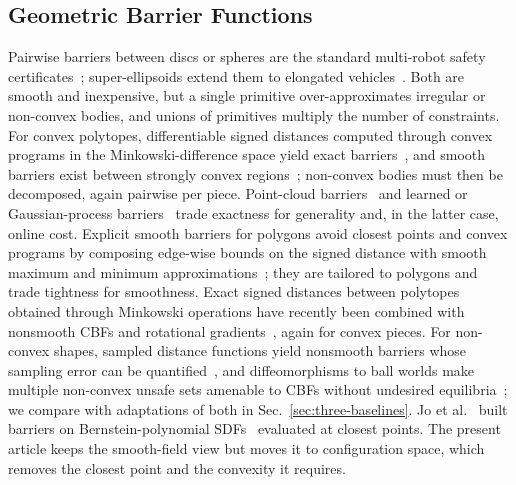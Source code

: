 \documentclass[journal]{IEEEtran}
\theoremstyle{definition}
\begin{document}
\subsection{Geometric Barrier Functions}
Pairwise barriers between discs or spheres are the standard multi-robot safety
certificates~\cite{wang2017safety}; super-ellipsoids extend them to elongated
vehicles~\cite{wang2017quadrotors}. Both are smooth and inexpensive, but a single primitive
over-approximates irregular or non-convex bodies, and unions of primitives multiply the number of
constraints. For convex polytopes, differentiable signed distances computed through convex programs
in the Minkowski-difference space yield exact barriers~\cite{chen2025minkowski}, and smooth
barriers exist between strongly convex regions~\cite{thirugnanam2025strongly}; non-convex bodies
must then be decomposed, again pairwise per piece. Point-cloud barriers~\cite{dai2024sailing} and
learned or Gaussian-process barriers~\cite{long2021learning,khan2022gaussian} trade exactness for
generality and, in the latter case, online cost. Explicit smooth barriers for polygons avoid
closest points and convex programs by composing edge-wise bounds on the signed distance with smooth
maximum and minimum approximations~\cite{wu2025optimization}; they are tailored to polygons and
trade tightness for smoothness. Exact signed distances between polytopes obtained through Minkowski
operations have recently been combined with nonsmooth CBFs and rotational
gradients~\cite{chen2026exact}, again for convex pieces. For non-convex shapes, sampled distance
functions yield nonsmooth barriers whose sampling error can be quantified~\cite{lutkus2025sampling},
and diffeomorphisms to ball worlds make multiple non-convex unsafe sets amenable to CBFs without
undesired equilibria~\cite{notomista2021nonconvex}; we compare with adaptations of both in
Sec.~\ref{sec:three-baselines}. Jo et al.~\cite{jo2026geometry} built
barriers on Bernstein-polynomial SDFs~\cite{li2024representing} evaluated at closest points. The
present article keeps the smooth-field view but moves it to configuration space, which removes the
closest point and the convexity it requires.
\end{document}
